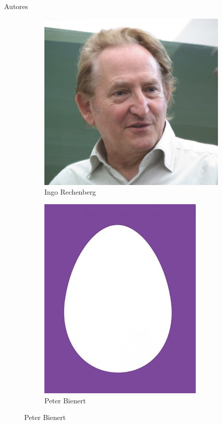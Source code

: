 \documentclass[10pt]{beamer}
\begin{document}
\begin{frame}[fragile]{Autores}
\begin{figure}[htp]
\begin{subfigure}[b]{.3\textwidth}
      \includegraphics[width=.95\textwidth]{imgs/rechenberg.jpg}
      \caption*{Ingo Rechenberg}
    \end{subfigure}%
    \begin{subfigure}[b]{.3\textwidth}
      \includegraphics[width=.95\textwidth]{imgs/bienert.jpg}
      \caption*{Peter Bienert}
    \end{subfigure}
  \end{figure}

\end{frame}
\end{document}
